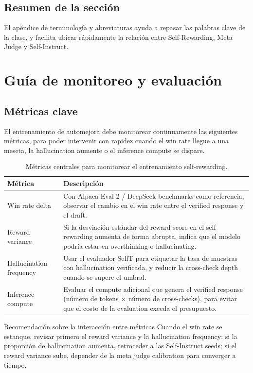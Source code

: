 \documentclass[a4paper]{article}
\begin{document}
\subsection{Resumen de la sección}
El apéndice de terminología y abreviaturas ayuda a repasar las palabras clave de la clase, y facilita ubicar rápidamente la relación entre Self-Rewarding, Meta Judge y Self-Instruct.

\section{Guía de monitoreo y evaluación}
\subsection{Métricas clave}
El entrenamiento de automejora debe monitorear continuamente las siguientes métricas, para poder intervenir con rapidez cuando el win rate llegue a una meseta, la hallucination aumente o el inference compute se dispare.

\begin{table}[H]
\centering
\begin{tabular}{p{5cm}p{10cm}}
\toprule
Métrica & Descripción \\
\midrule
Win rate delta & Con Alpaca Eval 2 / DeepSeek benchmarks como referencia, observar el cambio en el win rate entre el verified response y el draft. \\
Reward variance & Si la desviación estándar del reward score en el self-rewarding aumenta de forma abrupta, indica que el modelo podría estar en overthinking o hallucinating. \\
Hallucination frequency & Usar el evaluador SelfT para etiquetar la tasa de muestras con hallucination verificada, y reducir la cross-check depth cuando se supere el umbral. \\
Inference compute & Evaluar el compute adicional que genera el verified response (número de tokens × número de cross-checks), para evitar que el costo de la evaluation exceda el presupuesto. \\
\bottomrule
\end{tabular}
\caption{Métricas centrales para monitorear el entrenamiento self-rewarding.}
\end{table}

\begin{importantbox}{Recomendación sobre la interacción entre métricas}
Cuando el win rate se estanque, revisar primero el reward variance y la hallucination frequency: si la proporción de hallucination aumenta, retroceder a las Self-Instruct seeds; si el reward variance sube, depender de la meta judge calibration para converger a tiempo.
\end{importantbox}
\end{document}
